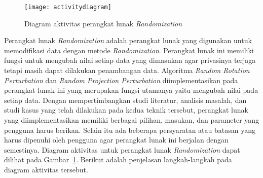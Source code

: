 \begin{figure}
    \centering
    \texttt{[image: activitydiagram]}
    \caption{Diagram aktivitas perangkat lunak \textit{Randomization}}
    \label{fig:activitydiagram}
\end{figure}

Perangkat lunak \textit{Randomization} adalah perangkat lunak yang digunakan untuk memodifikasi data dengan metode \textit{Randomization}. Perangkat lunak ini memiliki fungsi untuk mengubah nilai setiap data yang dimasukan agar privasinya terjaga tetapi masih dapat dilakukan penambangan data. Algoritma \textit{Random Rotation Perturbation} dan \textit{Random Projection Perturbation} diimplementasikan pada perangkat lunak ini yang merupakan fungsi utamanya yaitu mengubah nilai pada setiap data. Dengan mempertimbangkan studi literatur, analisis masalah, dan studi kasus yang telah dilakukan pada kedua teknik tersebut, perangkat lunak yang diimplementasikan memiliki berbagai pilihan, masukan, dan parameter yang pengguna harus berikan. Selain itu ada beberapa persyaratan atau batasan yang harus dipenuhi oleh pengguna agar perangkat lunak ini berjalan dengan semestinya. Diagram aktivitas untuk perangkat lunak \textit{Randomization} dapat dilihat pada Gambar~\ref{fig:activitydiagram}. Berikut adalah penjelasan langkah-langkah pada diagram aktivitas tersebut.
